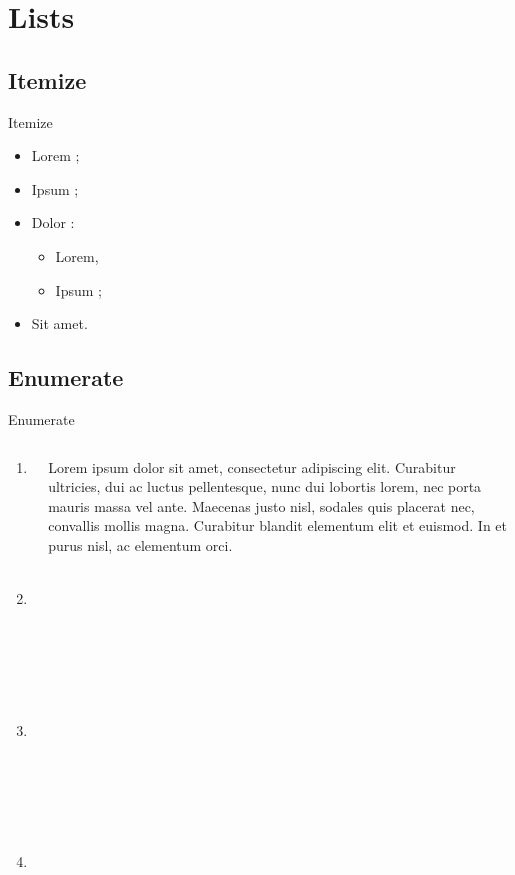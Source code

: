 \documentclass{beamer}
\begin{document}
\section{Lists} 
\subsection{Itemize}

\begin{frame}{Itemize}
  \begin{itemize}
    \item Lorem ; \pause
    \item Ipsum ;
    \item Dolor : \pause
      \begin{itemize}
        \item Lorem,
        \item Ipsum ;
      \end{itemize}
    \item Sit amet.
  \end{itemize} 
\end{frame}


\subsection{Enumerate}
\begin{frame}{Enumerate}
\begin{columns}
  \begin{column}{0.45\paperwidth}
      \begin{enumerate}
        \item Lorem ;
        \item<2-> Ipsum ;
        \item<2-> Dolor ;
        \item<2-> Sit amet.
      \end{enumerate}
  \end{column}

  \begin{column}{0.45\paperwidth}
    Lorem ipsum dolor sit amet, consectetur adipiscing elit. Curabitur 
    ultricies, dui ac luctus pellentesque, nunc dui lobortis lorem, nec 
    porta mauris massa vel ante. Maecenas justo nisl, sodales quis 
    placerat nec, convallis mollis magna. Curabitur blandit elementum 
    elit et euismod. In et purus nisl, ac elementum orci.
  \end{column}
\end{columns}

\end{frame}
\end{document}
